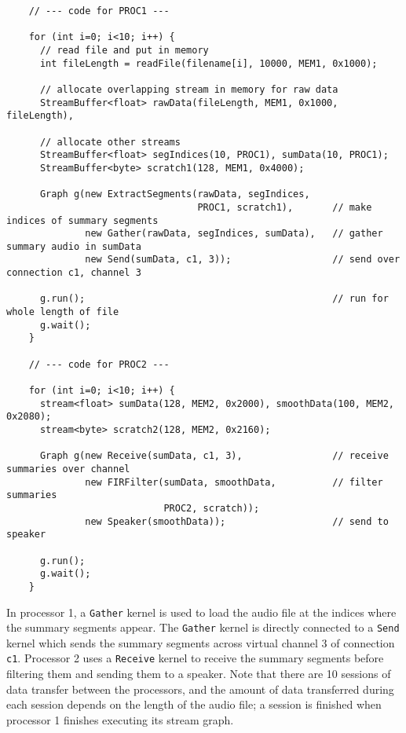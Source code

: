 {\small
\begin{verbatim}
    // --- code for PROC1 ---

    for (int i=0; i<10; i++) {
      // read file and put in memory
      int fileLength = readFile(filename[i], 10000, MEM1, 0x1000);

      // allocate overlapping stream in memory for raw data
      StreamBuffer<float> rawData(fileLength, MEM1, 0x1000, fileLength), 

      // allocate other streams
      StreamBuffer<float> segIndices(10, PROC1), sumData(10, PROC1);
      StreamBuffer<byte> scratch1(128, MEM1, 0x4000);

      Graph g(new ExtractSegments(rawData, segIndices, 
                                  PROC1, scratch1),       // make indices of summary segments
              new Gather(rawData, segIndices, sumData),   // gather summary audio in sumData
              new Send(sumData, c1, 3));                  // send over connection c1, channel 3

      g.run();                                            // run for whole length of file
      g.wait();
    }

    // --- code for PROC2 ---

    for (int i=0; i<10; i++) {
      stream<float> sumData(128, MEM2, 0x2000), smoothData(100, MEM2, 0x2080);
      stream<byte> scratch2(128, MEM2, 0x2160);

      Graph g(new Receive(sumData, c1, 3),                // receive summaries over channel
              new FIRFilter(sumData, smoothData,          // filter summaries
                            PROC2, scratch));        
              new Speaker(smoothData));                   // send to speaker

      g.run();
      g.wait();
    }   
\end{verbatim}}
In processor 1, a {\tt Gather} kernel is used to load the audio file at the indices where the
summary segments appear.  The {\tt Gather} kernel is directly connected to a {\tt Send} kernel
which sends the summary segments across virtual channel 3 of connection {\tt c1}.  Processor 2
uses a {\tt Receive} kernel to receive the summary segments before filtering them and sending
them to a speaker.  Note that there are 10 sessions of data transfer between the processors,
and the amount of data transferred during each session depends on the length of the audio file;
a session is finished when processor 1 finishes executing its stream graph.

